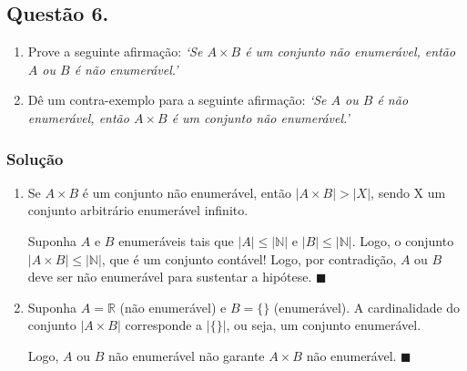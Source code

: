 \documentclass[12pt, letterpaper]{report}
\newcommand*{\CQD}{\hfill\ensuremath{\blacksquare}}%
\newcounter{ProblemNum}
\newcommand*{\anyproblem}[1]{\newpage\subsection*{#1}}
\newcommand*{\problem}[1]{\stepcounter{ProblemNum} %
   \anyproblem{Questão #1}}
\newcommand*{\soln}[1]{\subsubsection*{#1}}
\newcommand*{\solution}{\soln{Solução}}
\begin{document}
\problem{6.}

  \begin{enumerate}[label=\arabic*.]
    \item Prove a seguinte afirmação: \textit{`Se $ A \times B $ é um conjunto não enumerável, então $ A $ ou $ B $ é não enumerável.'}
    \item Dê um contra-exemplo para a seguinte afirmação: \textit{`Se $ A $ ou $ B $ é não enumerável, então $ A \times B $ é um conjunto não enumerável.'}
  \end{enumerate}

\solution
  \begin{enumerate}[label=\arabic*.]
    \item Se $ A \times B $ é um conjunto não enumerável, então $ | A \times B | > | X | $, sendo X um conjunto arbitrário enumerável infinito. 

    Suponha $A$ e $B$ enumeráveis tais que $|A| \leq | \mathbb{N} |$ e $|B| \leq | \mathbb{N} |$. Logo, o conjunto $ | A \times B | \leq |\mathbb{N}|$, que é um conjunto contável! Logo, por contradição, $A$ ou $B$ deve ser não enumerável para sustentar a hipótese. \CQD

    \item Suponha $ A = \mathbb{R} $ (não enumerável) e $ B = \{\} $ (enumerável). A cardinalidade do conjunto $ |A \times B| $ corresponde a $|\{\}|$, ou seja, um conjunto enumerável.

    Logo, $A$ ou $B$ não enumerável não garante $A \times B$ não enumerável. \CQD
  \end{enumerate}
\end{document}
